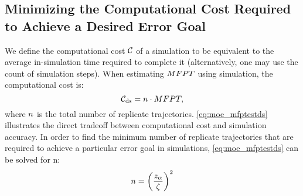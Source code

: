 \subsection{Minimizing the Computational Cost Required to Achieve a Desired Error Goal}
We define the computational cost $\mathcal{C}$ of a simulation to be equivalent to the average in-simulation time required to complete it (alternatively, one may use the count of simulation steps). When estimating $MFPT$ using  simulation, the computational cost is:
    \begin{equation}\label{eq:cost_mfptestds}
        {\mathcal{C}}_{\textrm{ds}} = n \cdot MFPT,
    \end{equation}
where $n$ is the total number of replicate trajectories. \eqref{eq:moe_mfptestds} illustrates the direct tradeoff between computational cost and simulation accuracy. In order to find the minimum number of replicate trajectories that are required to achieve a particular error goal in  simulations, \eqref{eq:moe_mfptestds} can be solved for n:
    \begin{equation}\label{eq:ds_optimizing}
        n = {\left( \frac{z_{\alpha}}{\zeta} \right)}^{2}
    \end{equation}

